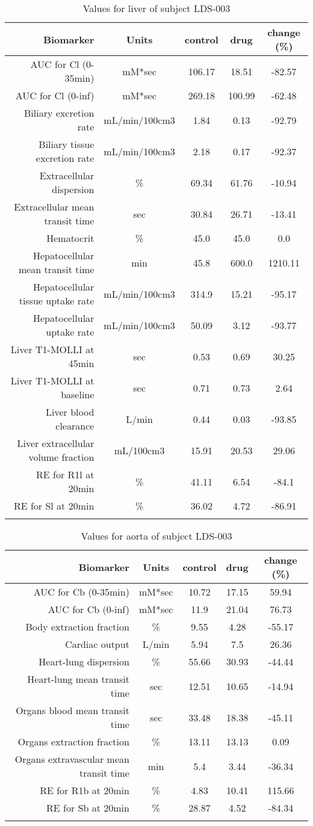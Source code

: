 \documentclass{epflreport}%
\begin{document}
%
\clearpage%
\begin{longtable}{rcccc}%
\hline%
Biomarker&Units&control&drug&change (\%)\\%
\hline%
AUC for Cl (0{-}35min)&mM*sec&106.17&18.51&{-}82.57\\%
AUC for Cl (0{-}inf)&mM*sec&269.18&100.99&{-}62.48\\%
Biliary excretion rate&mL/min/100cm3&1.84&0.13&{-}92.79\\%
Biliary tissue excretion rate&mL/min/100cm3&2.18&0.17&{-}92.37\\%
Extracellular dispersion&\%&69.34&61.76&{-}10.94\\%
Extracellular mean transit time&sec&30.84&26.71&{-}13.41\\%
Hematocrit&\%&45.0&45.0&0.0\\%
Hepatocellular mean transit time&min&45.8&600.0&1210.11\\%
Hepatocellular tissue uptake rate&mL/min/100cm3&314.9&15.21&{-}95.17\\%
Hepatocellular uptake rate&mL/min/100cm3&50.09&3.12&{-}93.77\\%
Liver T1{-}MOLLI at 45min&sec&0.53&0.69&30.25\\%
Liver T1{-}MOLLI at baseline&sec&0.71&0.73&2.64\\%
Liver blood clearance&L/min&0.44&0.03&{-}93.85\\%
Liver extracellular volume fraction&mL/100cm3&15.91&20.53&29.06\\%
RE for R1l at 20min&\%&41.11&6.54&{-}84.1\\%
RE for Sl at 20min&\%&36.02&4.72&{-}86.91\\%
\hline%
\caption{Values for liver of subject LDS-003} \\%
\end{longtable}%
\begin{longtable}{rcccc}%
\hline%
Biomarker&Units&control&drug&change (\%)\\%
\hline%
AUC for Cb (0{-}35min)&mM*sec&10.72&17.15&59.94\\%
AUC for Cb (0{-}inf)&mM*sec&11.9&21.04&76.73\\%
Body extraction fraction&\%&9.55&4.28&{-}55.17\\%
Cardiac output&L/min&5.94&7.5&26.36\\%
Heart{-}lung dispersion&\%&55.66&30.93&{-}44.44\\%
Heart{-}lung mean transit time&sec&12.51&10.65&{-}14.94\\%
Organs blood mean transit time&sec&33.48&18.38&{-}45.11\\%
Organs extraction fraction&\%&13.11&13.13&0.09\\%
Organs extravascular mean transit time&min&5.4&3.44&{-}36.34\\%
RE for R1b at 20min&\%&4.83&10.41&115.66\\%
RE for Sb at 20min&\%&28.87&4.52&{-}84.34\\%
\hline%
\caption{Values for aorta of subject LDS-003} \\%
\end{longtable}%
\clearpage%
\end{document}
